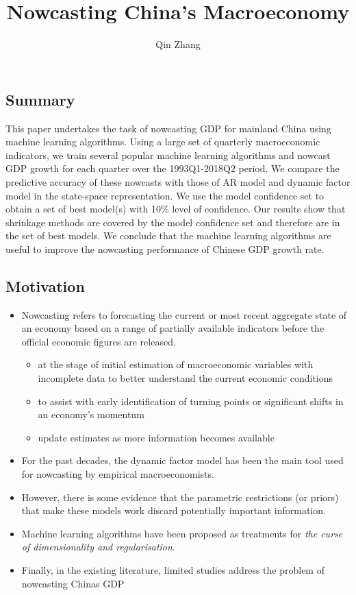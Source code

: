 \documentclass[thesis]{hmcposter}
\author{Qin Zhang}
\title{Nowcasting China's Macroeconomy}
\begin{document}
\begin{poster}
\subsection{Summary}
This paper undertakes the task of nowcasting GDP for mainland China using machine learning algorithms. Using a large set of quarterly macroeconomic indicators, we train several popular machine learning algorithms and nowcast GDP growth for each quarter over the 1993Q1-2018Q2 period. We compare the predictive accuracy of these nowcasts with those of AR model and dynamic factor model in the state-space representation. We use the model confidence set to obtain a set of best model(s) with 10\% level of confidence. Our results show that shrinkage methods are covered by the model confidence set and therefore are in the set of best models. We conclude that the machine learning algorithms are useful to improve the nowcasting performance of Chinese GDP growth rate.

\subsection{Motivation}%
\begin{itemize}
\item Nowcasting refers to forecasting the current or most recent aggregate state of an economy based on a range of partially available indicators before the official economic figures are released.
\begin{itemize}
    \item at the stage of initial estimation of macroeconomic variables with incomplete data to better understand the current economic conditions
    \item to assist with early identification of turning points or significant shifts in an economy's momentum
    \item update estimates as more information becomes available
\end{itemize}
\item For the past decades, the dynamic factor model has been the main tool used for nowcasting by empirical macroeconomists.
\item However, there is some evidence that the parametric restrictions (or priors) that make these models work discard potentially important information.
\item Machine learning algorithms have been proposed as treatments for \textit{the curse of dimensionality and regularisation}.
\item Finally, in the existing literature, limited studies address the problem of nowcasting Chinas GDP
\end{itemize}



\end{poster}
\end{document}
